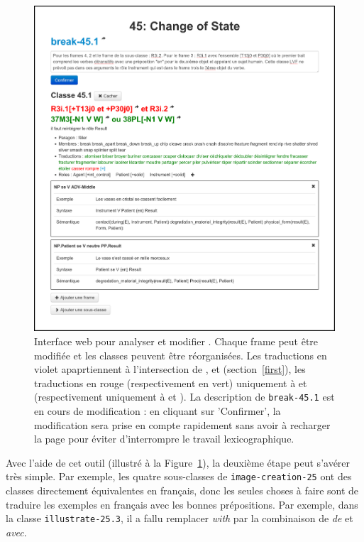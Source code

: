 \begin{figure}

    \includegraphics[width=\textwidth]{fig/tool_screenshot_2014-09-12.png}

    \caption{\label{tool}Interface web pour analyser et modifier \verbenet{}.
        Chaque frame peut être modifiée et les classes peuvent être
        réorganisées. Les traductions en violet apaprtiennent à l'intersection
        de \Clvf{}, \Clg{} et \Ltrad{} (section~\ref{first}), les traductions
        en rouge (respectivement en vert) uniquement à \Clvf{} et \Ltrad
        (respectivement uniquement à \Clg{} et \Ltrad{}). La description de
        {\color{blue}\texttt{break-45.1}} est en cours de modification : en cliquant sur
        'Confirmer', la modification sera prise en compte rapidement sans avoir
    à recharger la page pour éviter d'interrompre le travail lexicographique.}

\end{figure}

Avec l'aide de cet outil (illustré à la Figure~\ref{tool}), la deuxième étape
peut s'avérer très simple. Par exemple, les quatre sous-classes de
{\color{blue}\texttt{image-creation-25}} ont des classes directement équivalentes en
français, donc les seules choses à faire sont de traduire les exemples en
français avec les bonnes prépositions. Par exemple, dans la classe
{\color{blue}\texttt{illustrate-25.3}}, il a fallu remplacer \textit{with} par la
combinaison de \textit{de} et \textit{avec}.


